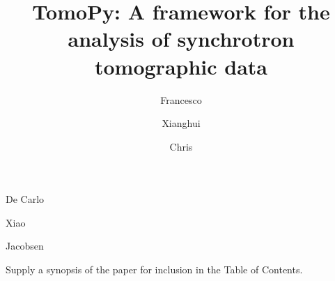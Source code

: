 \documentclass[pdf]{iucr}              %
\begin{document}



\title{TomoPy: A framework for the analysis of synchrotron tomographic data}


\author{Francesco}{De Carlo}
\author{Xianghui}{Xiao}
\author{Chris}{Jacobsen}







\maketitle                        %

\begin{synopsis}
Supply a synopsis of the paper for inclusion in the Table of Contents.
\end{synopsis}
\end{document}

